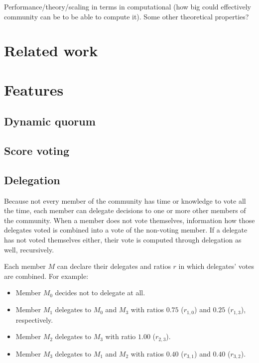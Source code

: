 \documentclass{sigchi}
\begin{document}
Performance/theory/scaling in terms in computational (how big could effectively community can be to be able to compute it).
Some other theoretical properties?

\section{Related work}

\cite{andersen2008trust, dirnstorfer2010voting, ford2002delegative, rodriguez2007smartocracy, yamakawa2007toward}

\section{Features}

\subsection{Dynamic quorum}

\subsection{Score voting}


\subsection{Delegation}

Because not every member of the community has time or knowledge to vote all the time, each member can delegate
decisions to one or more other members of the community.
When a member does not vote themselves, information how those delegates voted is combined into a vote of
the non-voting member.
If a delegate has not voted themselves either, their vote is computed through delegation as well, recursively.

Each member $M$ can declare their delegates and ratios $r$ in which delegates' votes are combined. For example:

\begin{itemize}
\item Member $M_0$ decides not to delegate at all.
\item Member $M_1$ delegates to $M_0$ and $M_3$ with ratios $0.75$ ($r_{1,0}$) and $0.25$ ($r_{1,3}$), respectively.
\item Member $M_2$ delegates to $M_3$ with ratio $1.00$ ($r_{2,3}$).
\item Member $M_3$ delegates to $M_1$ and $M_2$ with ratios $0.40$ ($r_{3,1}$) and $0.40$ ($r_{3,2}$).
\end{itemize}
\end{document}
